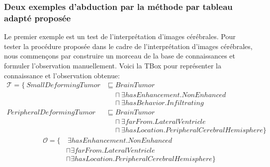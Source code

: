 \documentclass{article}
\begin{document}
\subsubsection{Deux exemples d'abduction par la méthode par tableau adapté proposée}
\label{exemples}
Le premier exemple est un test de l'interprétation d'images cérébrales.
Pour tester la procédure proposée dans le cadre de l'interprétation d'images cérébrales, nous commençons
par construire un morceau de la base de connaissances et formuler l'observation manuellement.
Voici la TBox pour représenter la connaissance et l'observation obtenue:\vspace{-0.3cm}
\begin{align*}
\mathcal{T}=\{~SmallDeformingTumor &\sqsubseteq BrainTumor\\
 &~~~~~\sqcap \exists hasEnhancement. NonEnhanced \\
&~~~~~\sqcap \exists hasBehavior. Infiltrating  \\
PeripheralDeformingTumor &\sqsubseteq BrainTumor\\
&~~~~~ \sqcap \exists farFrom. LateralVentricle \\
&~~~~~ \sqcap \exists hasLocation. PeripheralCerebralHemisphere \} 
\end{align*}\vspace{-0.9cm}
\begin{align*}
\mathcal{O} =\{&~\exists hasEnhancement. NonEnhanced \\
 &\sqcap \exists farFrom. LateralVentricle \\
&\sqcap \exists hasLocation. PeripheralCerebralHemisphere \} 
\end{align*}
\end{document}
